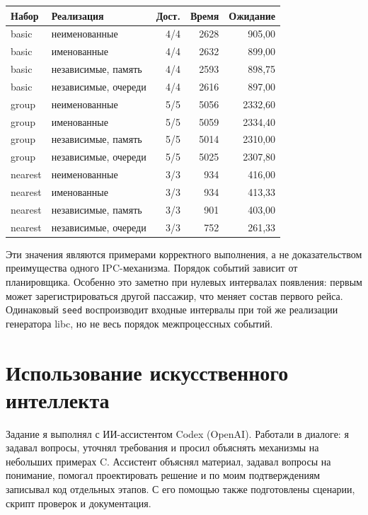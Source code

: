\documentclass[12pt,a4paper]{article}
\begin{document}
\begin{center}
\begin{tabular}{@{}llrrr@{}}
\textbf{Набор} & \textbf{Реализация} & \textbf{Дост.} & \textbf{Время} & \textbf{Ожидание} \\
\hline
basic & неименованные & 4/4 & 2628 & 905,00 \\
basic & именованные & 4/4 & 2632 & 899,00 \\
basic & независимые, память & 4/4 & 2593 & 898,75 \\
basic & независимые, очереди & 4/4 & 2616 & 897,00 \\
\hline
group & неименованные & 5/5 & 5056 & 2332,60 \\
group & именованные & 5/5 & 5059 & 2334,40 \\
group & независимые, память & 5/5 & 5014 & 2310,00 \\
group & независимые, очереди & 5/5 & 5025 & 2307,80 \\
\hline
nearest & неименованные & 3/3 & 934 & 416,00 \\
nearest & именованные & 3/3 & 934 & 413,33 \\
nearest & независимые, память & 3/3 & 901 & 403,00 \\
nearest & независимые, очереди & 3/3 & 752 & 261,33 \\
\hline
\end{tabular}
\end{center}

Эти значения являются примерами корректного выполнения, а не
доказательством преимущества одного IPC-механизма. Порядок событий
зависит от планировщика. Особенно это заметно при нулевых интервалах
появления: первым может зарегистрироваться другой пассажир, что меняет
состав первого рейса. Одинаковый \verb|seed| воспроизводит входные
интервалы при той же реализации генератора libc, но не весь порядок
межпроцессных событий.

\section{Использование искусственного интеллекта}

Задание я выполнял с ИИ-ассистентом Codex (OpenAI). Работали в диалоге:
я задавал вопросы, уточнял требования и просил объяснять механизмы на
небольших примерах C. Ассистент объяснял материал, задавал вопросы на
понимание, помогал проектировать решение и по моим подтверждениям
записывал код отдельных этапов. С его помощью также подготовлены
сценарии, скрипт проверок и документация.
\end{document}
